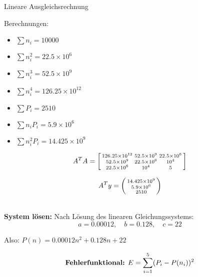 \begin{example2}{Lineare Ausgleichsrechnung}
\begin{minipage}{0.38\linewidth}
Berechnungen:
\begin{itemize}
    \item $\sum n_i = 10000$
    \item $\sum n_i^2 = 22.5 \times 10^6$
    \item $\sum n_i^3 = 52.5 \times 10^9$
    \item $\sum n_i^4 = 126.25 \times 10^{12}$
    \item $\sum P_i = 2510$
    \item $\sum n_i P_i = 5.9 \times 10^6$
    \item $\sum n_i^2 P_i = 14.425 \times 10^9$
\end{itemize}
\end{minipage}
\begin{minipage}{0.7\linewidth}
$$A^T A = \begin{bsmallmatrix}
126.25 \times 10^{12} & 52.5 \times 10^9 & 22.5 \times 10^6 \\
52.5 \times 10^9 & 22.5 \times 10^6 & 10^4 \\
22.5 \times 10^6 & 10^4 & 5
\end{bsmallmatrix}$$

$$A^T y = \begin{psmallmatrix} 14.425 \times 10^9 \\ 5.9 \times 10^6 \\ 2510 \end{psmallmatrix}$$
\end{minipage}
\vspace{2mm}\\
\textbf{System lösen:}
Nach Lösung des linearen Gleichungssystems:
$$a = 0.00012, \quad b = 0.128, \quad c = 22$$

Also: $P(n) = 0.00012n^2 + 0.128n + 22$

$$\text{\textbf{Fehlerfunktional:} } E = \sum_{i=1}^{5} (P_i - P(n_i))^2$$



\end{example2}
